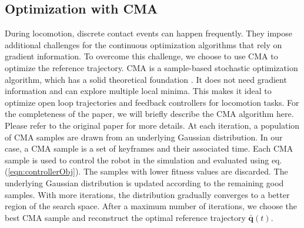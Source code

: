 \subsection{Optimization with CMA}
During locomotion, discrete contact events can happen frequently. They impose additional challenges for the continuous optimization algorithms that rely on gradient information. To overcome this challenge, we choose to use CMA to optimize the reference trajectory. CMA is a sample-based stochastic optimization algorithm, which has a solid theoretical foundation \cite{akimoto:2010,glasmachers:2010}. It does not need gradient information and can explore multiple local minima. This makes it ideal to optimize open loop trajectories and feedback controllers for locomotion tasks. For the completeness of the paper, we will briefly describe the CMA algorithm here. Please refer to the original paper \cite{Hansen:2009} for more details. At each iteration, a population of CMA samples are drawn from an underlying Gaussian distribution. In our case, a CMA sample is a set of keyframes and their associated time. Each CMA sample is used to control the robot in the simulation and evaluated using eq.(\ref{eqn:controllerObj}). The samples with lower fitness values are discarded. The underlying Gaussian distribution is updated according to the remaining good samples. With more iterations, the distribution gradually converges to a better region of the search space. After a maximum number of iterations, we choose the best CMA sample and reconstruct the optimal reference trajectory $\bar{\mathbf{q}}(t)$.
